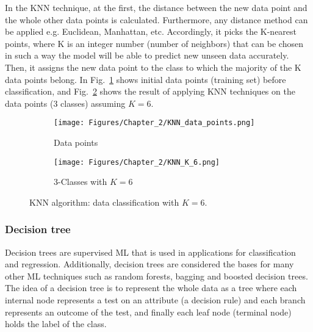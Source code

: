 In the KNN technique, at the first, the distance between the new data point and the whole other data points is calculated.
Furthermore, any distance method can be applied e.g. Euclidean, Manhattan, etc.
Accordingly, it picks the K-nearest points, where K is an integer number (number of neighbors) that can be chosen in such a way the model will be able to predict new unseen data accurately. 
Then, it assigns the new data point to the class to which the majority of the K data points belong.
In Fig.~\ref{fig:datapoints} shows initial data points (training set) before classification, and Fig.~\ref{fig:KNN_K_5} shows the result of applying KNN techniques on the data points (3 classes) assuming \(K=6\).
\begin{figure}[!ht]
	\centering
	\begin{subfigure}{0.49\textwidth}		
		\centering
		\texttt{[image: Figures/Chapter\_2/KNN\_data\_points.png]}
		\caption{Data points} 
		\label{fig:datapoints}
	\end{subfigure}
	\hfill
	\begin{subfigure}{0.49\textwidth}
		\centering
		\texttt{[image: Figures/Chapter\_2/KNN\_K\_6.png]}
		\caption{3-Classes with \(K=6\)} 
		\label{fig:KNN_K_5}
	\end{subfigure}	
	\caption{KNN algorithm: data classification with \(K=6\).}
	\label{fig:KNN}
\end{figure}
\subsubsection{Decision tree}
Decision trees are supervised ML that is used in applications for classification and regression. 
Additionally, decision trees are considered the bases for many other ML techniques such as random forests, bagging and boosted decision trees.
The idea of a decision tree is to represent the whole data as a tree where each internal node represents a test on an attribute (a decision rule) and each branch represents an outcome of the test, and finally each leaf node (terminal node) holds the label of the class.

